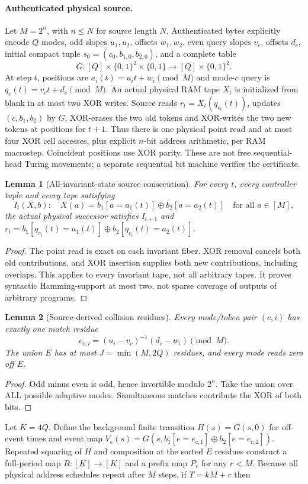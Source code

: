 \documentclass[11pt]{article}
\newtheorem{lemma}{Lemma}\newtheorem{theorem}{Theorem}\newtheorem{proposition}{Proposition}
\begin{document}
\paragraph{Authenticated physical source.}
Let $M=2^n$, with $n\le N$ for source length $N$. Authenticated bytes explicitly encode $Q$ modes, odd slopes $u_1,u_2$, offsets $w_1,w_2$, even query slopes $v_c$, offsets $d_c$, initial compact tuple $s_0=(c_0,b_{1,0},b_{2,0})$, and a complete table
\[
G:[Q]\times\{0,1\}^2\times\{0,1\}\longrightarrow[Q]\times\{0,1\}^2.
\]
At step $t$, positions are $a_i(t)=u_it+w_i\pmod M$ and mode-$c$ query is $q_c(t)=v_ct+d_c\pmod M$. An actual physical RAM tape $X_t$ is initialized from blank in at most two XOR writes. Source reads $r_t=X_t(q_{c_t}(t))$, updates $(c,b_1,b_2)$ by $G$, XOR-erases the two old tokens and XOR-writes the two new tokens at positions for $t+1$. Thus there is one physical point read and at most four XOR cell accesses, plus explicit $n$-bit address arithmetic, per RAM macrostep. Coincident positions use XOR parity. These are not free sequential-head Turing movements; a separate sequential bit machine verifies the certificate.
\begin{lemma}[All-invariant-state source consecution]
For every $t$, every controller tuple and every tape satisfying
\[
I_t(X,b):\quad X(a)=b_1[a=a_1(t)]\oplus b_2[a=a_2(t)]\quad\text{for all }a\in[M],
\]
the actual physical successor satisfies $I_{t+1}$ and
$r_t=b_1[q_{c_t}(t)=a_1(t)]\oplus b_2[q_{c_t}(t)=a_2(t)]$.
\end{lemma}
\begin{proof}The point read is exact on each invariant fiber. XOR removal cancels both old contributions, and XOR insertion supplies both new contributions, including overlaps. This applies to every invariant tape, not all arbitrary tapes. It proves syntactic Hamming-support at most two, not sparse coverage of outputs of arbitrary programs.\end{proof}
\begin{lemma}[Source-derived collision residues]
Every mode/token pair $(c,i)$ has exactly one match residue
\[
e_{c,i}=(u_i-v_c)^{-1}(d_c-w_i)\pmod M.
\]
The union $E$ has at most $J=\min(M,2Q)$ residues, and every mode reads zero off $E$.
\end{lemma}
\begin{proof}Odd minus even is odd, hence invertible modulo $2^n$. Take the union over ALL possible adaptive modes. Simultaneous matches contribute the XOR of both bits.\end{proof}
Let $K=4Q$. Define the background finite transition $H(s)=G(s,0)$ for off-event times and event map $V_e(s)=G(s,b_1[e=e_{c,1}]\oplus b_2[e=e_{c,2}])$. Repeated squaring of $H$ and composition at the sorted $E$ residues construct a full-period map $R:[K]\to[K]$ and a prefix map $P_r$ for any $r<M$. Because all physical address schedules repeat after $M$ steps, if $T=kM+r$ then
\end{document}
